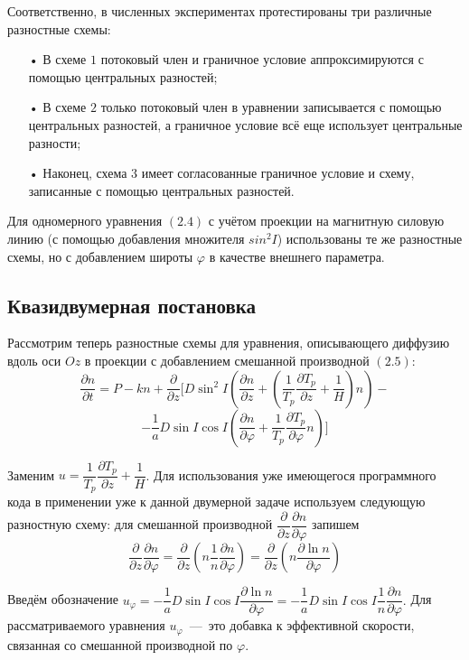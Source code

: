 \documentclass[14pt, a4paper, fleqn]{extarticle}
\begin{document}
Соответственно, в численных экспериментах протестированы три различные разностные схемы: 
\begin{itemize}
\item[•] В схеме $1$ потоковый член и граничное условие аппроксимируются с помощью центральных разностей; 
\item[•] В схеме $2$ только потоковый член в уравнении записывается с помощью центральных разностей, а граничное условие всё еще использует центральные разности;
\item[•] Наконец, схема $3$ имеет согласованные граничное условие и схему, записанные с помощью центральных разностей.
\end{itemize}

Для одномерного уравнения $(2.4)$ с учётом проекции на магнитную силовую линию (с помощью добавления множителя $sin^2 I$) использованы те же разностные схемы, но с добавлением широты $\varphi$ в качестве внешнего параметра.



\subsection{Квазидвумерная постановка}

Рассмотрим теперь разностные схемы для уравнения, описывающего диффузию вдоль оси $Oz$ в проекции с добавлением смешанной производной $(2.5)$:$$\dfrac{\partial n}{\partial t} =P-kn+\dfrac{\partial}{\partial z}\biggl[D\sin^2 I\left(\dfrac{\partial n}{\partial z}+\left(\dfrac{1}{T_p}\dfrac{\partial T_p}{\partial z}+\dfrac{1}{H}\right)n\right)-$$ $$-\dfrac{1}{a}D\sin I\cos I\left(\dfrac{\partial n}{\partial\varphi}+\dfrac{1}{T_p}\dfrac{\partial T_p}{\partial\varphi}n\right)\biggr]$$

Заменим $u = \dfrac{1}{T_p}\dfrac{\partial T_p}{\partial z}+\dfrac{1}{H}$. Для использования уже имеющегося программного кода в применении уже к данной двумерной задаче используем следующую разностную схему: для смешанной производной $\dfrac{\partial}{\partial z}\dfrac{\partial n}{\partial \varphi}$ запишем $$\dfrac{\partial}{\partial z}\dfrac{\partial n}{\partial \varphi}=\dfrac{\partial}{\partial z}\left(n\dfrac{1}{n}\dfrac{\partial n}{\partial \varphi}\right) = \dfrac{\partial}{\partial z}\left(n\dfrac{\partial \ln n}{\partial \varphi}\right)$$

Введём обозначение $u_\varphi=-\dfrac{1}{a}D\sin I \cos I\dfrac{\partial \ln n}{\partial \varphi}=-\dfrac{1}{a}D\sin I \cos I\dfrac{1}{n}\dfrac{\partial n}{\partial \varphi}.$ Для рассматриваемого уравнения $u_\varphi$~---~это добавка к эффективной скорости, связанная со смешанной производной по $\varphi$.
\end{document}
